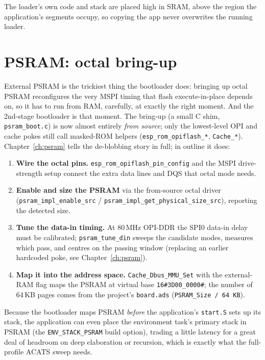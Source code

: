 The loader's own code and stack are placed high in SRAM, above the region the
application's segments occupy, so copying the app never overwrites the running
loader.

\section{PSRAM: octal bring-up}

External PSRAM is the trickiest thing the bootloader does: bringing up octal PSRAM
reconfigures the very MSPI timing that flash execute-in-place depends on, so it has
to run from RAM, carefully, at exactly the right moment. And the 2nd-stage
bootloader is that moment. The bring-up (a small C shim, \texttt{psram\_boot.c}) is
now almost entirely \emph{from source}; only the lowest-level OPI and cache pokes
still call masked-ROM helpers (\texttt{esp\_rom\_opiflash\_*}, \texttt{Cache\_*}).
Chapter~\ref{ch:psram} tells the de-blobbing story in full; in outline it does:

\begin{enumerate}
\item \textbf{Wire the octal pins.} \texttt{esp\_rom\_opiflash\_pin\_config} and
  the MSPI drive-strength setup connect the extra data lines and DQS that octal
  mode needs.
\item \textbf{Enable and size the PSRAM} via the from-source octal driver
  (\texttt{psram\_impl\_enable\_src} / \texttt{psram\_impl\_get\_physical\_size\_src}),
  reporting the detected size.
\item \textbf{Tune the data-in timing.} At 80\,MHz OPI-DDR the SPI0 data-in delay
  must be calibrated; \texttt{psram\_tune\_din} sweeps the candidate modes, measures
  which pass, and centres on the passing window (replacing an earlier hardcoded
  poke, see Chapter~\ref{ch:psram}).
\item \textbf{Map it into the address space.} \texttt{Cache\_Dbus\_MMU\_Set} with
  the external-RAM flag maps the PSRAM at virtual base \texttt{16\#3D00\_0000\#}; the
  number of 64\,KB pages comes from the project's \texttt{board.ads}
  (\texttt{PSRAM\_Size / 64\,KB}).
\end{enumerate}

Because the bootloader maps PSRAM \emph{before} the application's \texttt{start.S}
sets up its stack, the application can even place the environment task's primary
stack in PSRAM (the \texttt{ENV\_STACK\_PSRAM} build option), trading a little
latency for a great deal of headroom on deep elaboration or recursion, which
is exactly what the full-profile ACATS sweep needs.

